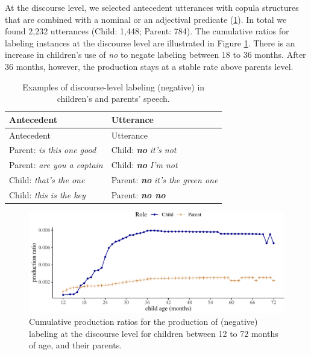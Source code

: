 \documentclass[
  man,floatsintext]{apa6}
\begin{document}
At the discourse level, we selected antecedent utterances with copula structures that are combined with a nominal or an adjectival predicate (\ref{tab:dislabel}). In total we found 2,232 utterances (Child: 1,448; Parent: 784). The cumulative ratios for labeling instances at the discourse level are illustrated in Figure \ref{fig:learningdiscourse}. There is an increase in children's use of \emph{no} to negate labeling between 18 to 36 months. After 36 months, however, the production stays at a stable rate above parents level.

\begin{longtable}[]{@{}ll@{}}
\caption{\label{tab:dislabel} Examples of discourse-level labeling (negative) in children's and parents' speech.}\tabularnewline
\toprule\noalign{}
Antecedent & Utterance \\
\midrule\noalign{}
\endfirsthead
\toprule\noalign{}
Antecedent & Utterance \\
\midrule\noalign{}
\endhead
\bottomrule\noalign{}
\endlastfoot
Parent: \emph{is this one good} & Child: \textbf{\emph{no}} \emph{it's not} \\
Parent: \emph{are you a captain} & Child: \textbf{\emph{no}} \emph{I'm not} \\
Child: \emph{that's the one} & Parent: \textbf{\emph{no}} \emph{it's the green one} \\
Child: \emph{this is the key} & Parent: \textbf{\emph{no no}} \\
\end{longtable}

\begin{figure}[H]

{\centering \includegraphics{neg_construction_article_files/figure-latex/learningdiscourse-1} 

}

\caption{Cumulative production ratios for the production of (negative) labeling at the discourse level for children between 12 to 72 months of age, and their parents.}\label{fig:learningdiscourse}
\end{figure}
\end{document}
